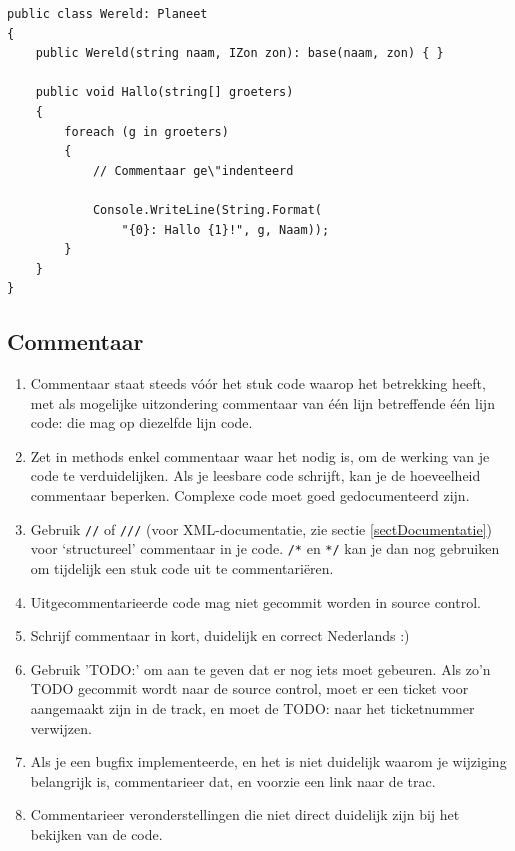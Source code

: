\documentclass[a4paper,11pt]{article}
\begin{document}
\begin{lstlisting}[float, caption=Indentatie, label=lblLstWhitespace]
public class Wereld: Planeet
{
	public Wereld(string naam, IZon zon): base(naam, zon) { }

	public void Hallo(string[] groeters)
	{
		foreach (g in groeters)
		{
			// Commentaar ge\"indenteerd

			Console.WriteLine(String.Format(
				"{0}: Hallo {1}!", g, Naam));
		}
	}	
}
\end{lstlisting}


\subsection{Commentaar}

\begin{enumerate}[resume]
\item Commentaar staat steeds v\'o\'or het stuk code waarop het betrekking
heeft, met als mogelijke uitzondering commentaar van \'e\'en lijn betreffende \'e\'en
lijn code: die mag op diezelfde lijn code.
\item Zet in methods enkel commentaar waar het nodig is, om de werking van je code te
verduidelijken.  Als je leesbare code schrijft, kan je de hoeveelheid commentaar beperken.
Complexe code moet goed gedocumenteerd zijn.
\item Gebruik \lstinline !//! of \lstinline !///! (voor XML-documentatie, zie sectie
\ref{sectDocumentatie}) voor `structureel'
commentaar in je code.  \lstinline !/*! en \lstinline !*/! kan je dan nog gebruiken om tijdelijk
een stuk code uit te commentari\"eren.
\item Uitgecommentarieerde code mag niet gecommit worden in source control.
\item Schrijf commentaar in kort, duidelijk en correct Nederlands :)
\item Gebruik 'TODO:' om aan te geven dat er nog iets moet gebeuren.  Als
zo'n TODO gecommit wordt naar de source control, moet er een
ticket voor aangemaakt zijn in de track, en moet de TODO: naar het
ticketnummer verwijzen.
\item Als je een bugfix implementeerde, en het is niet duidelijk waarom je
wijziging belangrijk is, commentarieer dat, en voorzie een link naar de
trac.
\item Commentarieer veronderstellingen die niet direct duidelijk zijn bij
het bekijken van de code.
\end{enumerate}
\end{document}
